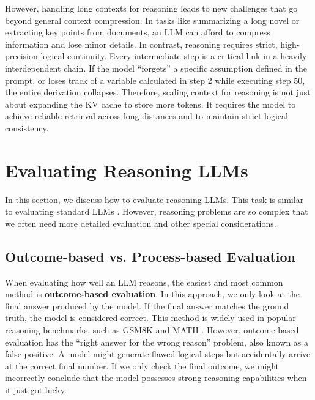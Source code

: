 However, handling long contexts for reasoning leads to new challenges that go beyond general context compression. In tasks like summarizing a long novel or extracting key points from documents, an LLM can afford to compress information and lose minor details. In contrast, reasoning requires strict, high-precision logical continuity. Every intermediate step is a critical link in a heavily interdependent chain. If the model ``forgets'' a specific assumption defined in the prompt, or loses track of a variable calculated in step 2 while executing step 50, the entire derivation collapses. Therefore, scaling context for reasoning is not just about expanding the KV cache to store more tokens. It requires the model to achieve reliable retrieval across long distances and to maintain strict logical consistency.


\section{Evaluating Reasoning LLMs}

In this section, we discuss how to evaluate reasoning LLMs. This task is similar to evaluating standard LLMs \cite{chang-etal:2024survey}. However, reasoning problems are so complex that we often need more detailed evaluation and other special considerations.

\subsection{Outcome-based vs. Process-based Evaluation}

When evaluating how well an LLM reasons, the easiest and most common method is \textbf{outcome-based evaluation}. In this approach, we only look at the final answer produced by the model. If the final answer matches the ground truth, the model is considered correct. This method is widely used in popular reasoning benchmarks, such as GSM8K \cite{cobbe-etal:2021training} and MATH \cite{hendrycks-etal:2measuring}. However, outcome-based evaluation has the ``right answer for the wrong reason'' problem, also known as a false positive. A model might generate flawed logical steps but accidentally arrive at the correct final number. If we only check the final outcome, we might incorrectly conclude that the model possesses strong reasoning capabilities when it just got lucky.

